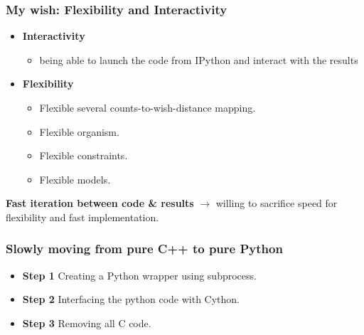 \documentclass[xcolor=dvipsnames]{beamer}
\begin{document}
\begin{frame}
\frametitle{My wish: Flexibility and Interactivity}
\begin{itemize}
\item {\bf \color{Blue} Interactivity} 
\begin{itemize}[label={$\bullet$}]
\item being able to launch the code from IPython and interact
with the results
\end{itemize}
\item {\bf \color{Blue} Flexibility}
\begin{itemize}[label={$\bullet$}]
\item Flexible several counts-to-wish-distance mapping.
\item Flexible organism.
\item Flexible constraints.
\item Flexible models.
\end{itemize}
\end{itemize}

\vspace{1em}
{\bf \color{Blue} Fast iteration between code \& results} $\rightarrow$
willing to sacrifice speed for flexibility and fast implementation.
\end{frame}

\begin{frame}
\frametitle{Slowly moving from pure C++ to pure Python}

\begin{itemize}
\item {\bf \color{Blue} Step 1} Creating a Python wrapper using subprocess.
\item {\bf \color{Blue} Step 2} Interfacing the python code with Cython.
\item {\bf \color{Blue} Step 3} Removing all C code.
\end{itemize}
\end{frame}
\end{document}
